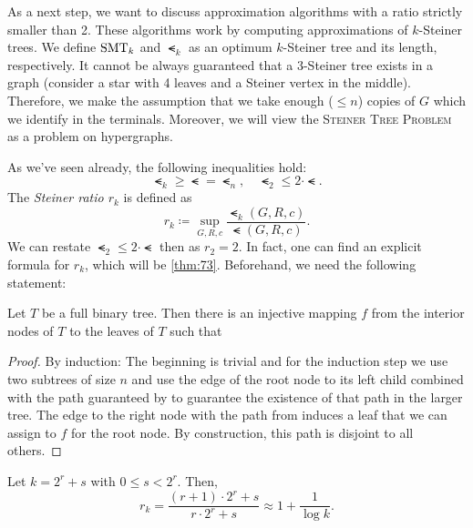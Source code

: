\documentclass[../skript.tex]{subfiles}
\begin{document}
As a next step, we want to discuss approximation algorithms with a ratio strictly smaller than 2. These algorithms work by computing approximations of $k$-Steiner trees.
We define $\operatorname{SMT}_k$ and $\smt_k$ as an optimum $k$-Steiner tree and its length, respectively.
It cannot be always guaranteed that a $3$-Steiner tree exists in a graph (consider a star with 4 leaves and a Steiner vertex in the middle). Therefore, we make the assumption that we take enough ($\leq n$) copies of $G$ which we identify in the terminals.
Moreover, we will view the \textsc{Steiner Tree Problem} as a problem on hypergraphs.

As we've seen already, the following inequalities hold:
\[
	\smt_k \geq \smt = \smt_n, \quad \smt_2 \leq 2 \cdot \smt.
\]
The \emph{Steiner ratio $r_k$} is defined as
\[
	r_k \coloneqq \sup_{G, R, c} \frac{\smt_k(G, R, c)}{\smt(G, R, c)}.
\]
We can restate $\smt_2 \leq 2 \cdot \smt$ then as $r_2 = 2$. In fact, one can find an explicit formula for $r_k$, which will be \cref{thm:73}. Beforehand, we need the following statement:
\begin{proposition} %
\label{thm:72}
Let $T$ be a full binary tree. Then there is an injective mapping $f$ from the interior nodes of $T$ to the leaves of $T$ such that
\end{proposition}
\begin{proof}
By induction: The beginning is trivial and for the induction step we use two subtrees of size $n$ and use the edge of the root node to its left child combined with the path guaranteed by  to guarantee the existence of that path in the larger tree. The edge to the right node with the path from  induces a leaf that we can assign to $f$ for the root node. By construction, this path is disjoint to all others.
\end{proof}
\begin{theorem} %
\label{thm:73}
Let $k = 2^r + s$ with $0 \leq s < 2^r$.
Then,
\[
	r_k = \frac{(r+1) \cdot 2^r + s}{r \cdot 2^r + s} \approx 1 + \frac{1}{\log k}.
\]
\end{theorem}
\end{document}
